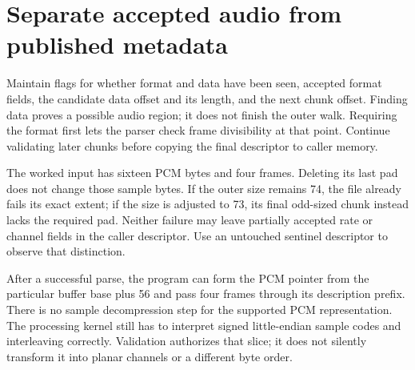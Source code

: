 \section{Separate accepted audio from published metadata}
Maintain flags for whether format and data have been seen, accepted format fields,
the candidate data offset and its length, and the next chunk offset. Finding data
proves a possible audio region; it does not finish the outer walk. Requiring the format
first lets the parser check frame divisibility at that point. Continue validating later
chunks before copying the final descriptor to caller memory.

The worked input has sixteen PCM bytes and four frames. Deleting its last pad does
not change those sample bytes. If the outer size remains 74, the file already fails
its exact extent; if the size is adjusted to 73, its final odd-sized chunk instead
lacks the required pad. Neither failure may leave partially accepted rate or channel fields in the
caller descriptor. Use an untouched sentinel descriptor to observe that distinction.

After a successful parse, the program can form the PCM pointer from the particular
buffer base plus 56 and pass four frames through its description prefix. There is no
sample decompression step for the supported PCM representation. The processing kernel
still has to interpret signed little-endian sample codes and interleaving correctly.
Validation authorizes that slice; it does not silently transform it into planar
channels or a different byte order.

